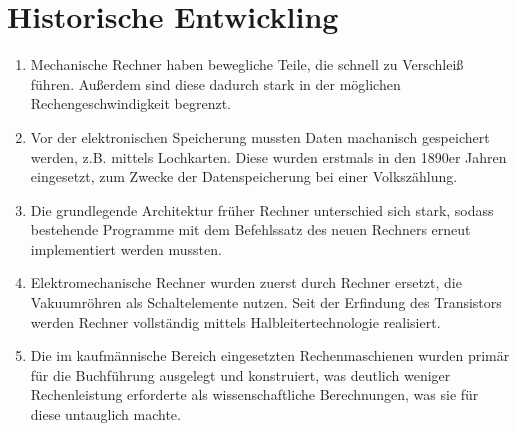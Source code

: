 \documentclass[a4paper]{article}
\begin{document}
\section{Historische Entwickling}
\begin{enumerate}[label=\alph*)]
    \item Mechanische Rechner haben bewegliche Teile, die schnell zu Verschleiß führen. Außerdem
        sind diese dadurch stark in der möglichen Rechengeschwindigkeit begrenzt.
    \item Vor der elektronischen Speicherung mussten Daten machanisch gespeichert werden, z.B.
        mittels Lochkarten. Diese wurden erstmals in den 1890er Jahren eingesetzt, zum Zwecke der
        Datenspeicherung bei einer Volkszählung.
    \item Die grundlegende Architektur früher Rechner unterschied sich stark, sodass bestehende
        Programme mit dem Befehlssatz des neuen Rechners erneut implementiert werden mussten.
    \item Elektromechanische Rechner wurden zuerst durch Rechner ersetzt, die Vakuumröhren
        als Schaltelemente nutzen. Seit der Erfindung des Transistors werden Rechner vollständig
        mittels Halbleitertechnologie realisiert.
    \item Die im kaufmännische Bereich eingesetzten Rechenmaschienen wurden primär für die
        Buchführung ausgelegt und konstruiert, was deutlich weniger Rechenleistung erforderte
        als wissenschaftliche Berechnungen, was sie für diese untauglich machte.

\end{enumerate}
\end{document}
